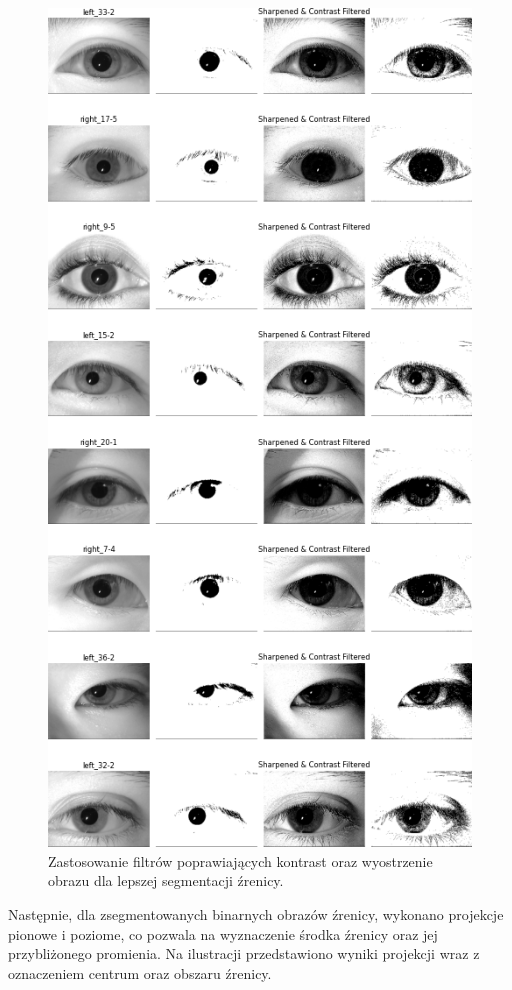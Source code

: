 \documentclass[a4paper]{article}
\begin{document}
\begin{figure}[H]
    \centering
    \includegraphics[width=0.9\linewidth]{figures/eye_filters_many.png}
    \caption{Zastosowanie filtrów poprawiających kontrast oraz wyostrzenie obrazu dla lepszej segmentacji źrenicy.}
    \label{fig:eye_filters_many}
\end{figure}

Następnie, dla zsegmentowanych binarnych obrazów źrenicy, wykonano projekcje pionowe i poziome, co pozwala na wyznaczenie środka źrenicy oraz jej przybliżonego promienia. Na ilustracji  przedstawiono wyniki projekcji wraz z oznaczeniem centrum oraz obszaru źrenicy.
\end{document}
